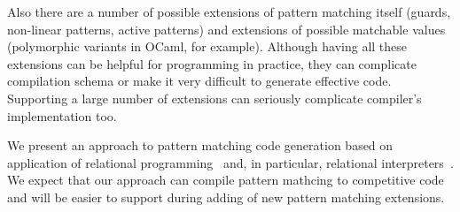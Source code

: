 \begin{comment}


\begin{figure}[ht]
\begin{minipage}[b]{0.3\linewidth}
\centering
\label{fig:figure1}
\end{minipage}
\hspace{0.5cm}
\begin{minipage}[b]{0.3\linewidth}
\centering
\begin{lstlisting}
switch x with 
| true -> 
    switch y with 
    | true -> 
       switch z with 
       | true -> 4
       | _ -> 3
    | _ -> 
      switch z with 
      | true -> 1
      | _ -> 3 
| _ -> 
   switch y with 
   | true -> 2 
   | _ -> if z then 1 else 3
\end{lstlisting}
\end{minipage}
\hspace{0.5cm}
\begin{minipage}[b]{0.3\linewidth}
\centering
\end{minipage}
\end{figure}
\end{comment}

Also there are a number of possible extensions of pattern matching itself (guards, non-linear patterns, active patterns) and extensions of possible matchable values (polymorphic variants in OCaml, for example). Although having all these extensions can be helpful for programming in practice, they can complicate compilation schema or make it very difficult to generate effective code. Supporting a large number  of extensions can seriously complicate compiler's implementation too.

We present an approach to pattern matching code generation based on application of relational programming~\cite{TRS,WillThesis} and, in
 particular, relational interpreters~\cite{unified}. We expect that our approach can compile pattern mathcing to competitive code and will be easier to support during adding of new pattern matching extensions.
 

